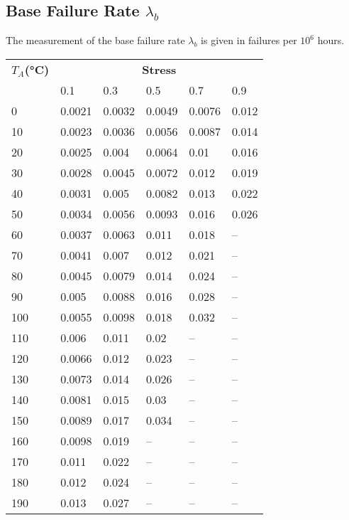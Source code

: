 \subsection{Base Failure Rate $\lambda_b$}
The measurement of the base failure rate $\lambda_b$ is given in failures per $10^6$ hours.
\begin{table}[ht]
{\centering

\begin{tabular}{|p{1.1cm}|*{5}{p{1.1cm}|}}
    \hline
    \textbf{$T_A$(°C)} & \multicolumn{5}{c|}{\textbf{Stress}} \\
    & 0.1 & 0.3 & 0.5 & 0.7 & 0.9 \\
    \hline
    0 & 0.0021 & 0.0032 & 0.0049 & 0.0076 & 0.012 \\
    \hline
    10 & 0.0023 & 0.0036 & 0.0056 & 0.0087 & 0.014 \\
    \hline
    20 & 0.0025 & 0.004 & 0.0064 & 0.01 & 0.016 \\
    \hline
    30 & 0.0028 & 0.0045 & 0.0072 & 0.012 & 0.019 \\
    \hline
    40 & 0.0031 & 0.005 & 0.0082 & 0.013 & 0.022 \\
    \hline
    50 & 0.0034 & 0.0056 & 0.0093 & 0.016 & 0.026 \\
    \hline
    60 & 0.0037 & 0.0063 & 0.011 & 0.018 & -- \\
    \hline
    70 & 0.0041 & 0.007 & 0.012 & 0.021 & -- \\
    \hline
    80 & 0.0045 & 0.0079 & 0.014 & 0.024 & -- \\
    \hline
    90 & 0.005 & 0.0088 & 0.016 & 0.028 & -- \\
    \hline
    100 & 0.0055 & 0.0098 & 0.018 & 0.032 & -- \\
    \hline
    110 & 0.006 & 0.011 & 0.02 & -- & -- \\
    \hline
    120 & 0.0066 & 0.012 & 0.023 & -- & -- \\
    \hline
    130 & 0.0073 & 0.014 & 0.026 & -- & -- \\
    \hline
    140 & 0.0081 & 0.015 & 0.03 & -- & -- \\
    \hline
    150 & 0.0089 & 0.017 & 0.034 & -- & -- \\
    \hline
    160 & 0.0098 & 0.019 & -- & -- & -- \\
    \hline
    170 & 0.011 & 0.022 & -- & -- & -- \\
    \hline
    180 & 0.012 & 0.024 & -- & -- & -- \\
    \hline
    190 & 0.013 & 0.027 & -- & -- & -- \\

\end{tabular}}
\end{table}
